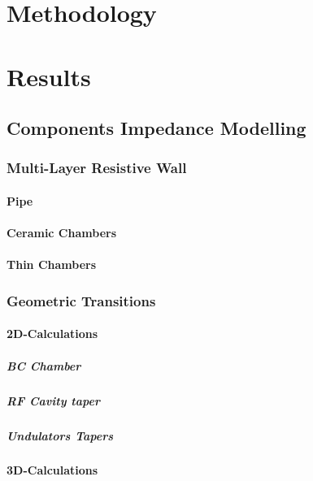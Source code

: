 \documentclass[
	12pt,				%
	openright,			%
	oneside,			%
	a4paper,		%
	chapter=TITLE,		%
	section=TITLE,		%
    brazil,				%
	english,			%
	sumario=tradicional,
	]{abntex2}
\begin{document}
\chapter{Methodology}
  \section{}

\chapter{Results}
  \section{Components Impedance Modelling}
    \subsection{Multi-Layer Resistive Wall}
      \subsubsection{Pipe}
      \subsubsection{Ceramic Chambers}
      \subsubsection{Thin Chambers}
    \subsection{Geometric Transitions}
      \subsubsection{2D-Calculations}
        \paragraph{BC Chamber}
        \paragraph{RF Cavity taper}
        \paragraph{Undulators Tapers}
      \subsubsection{3D-Calculations}
\end{document}

